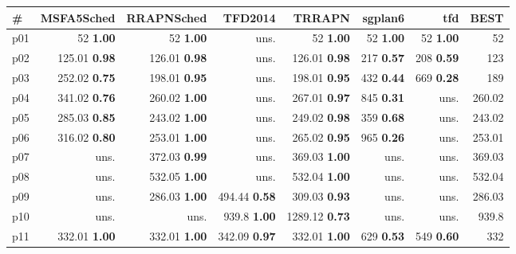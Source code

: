 \begin{tabular}{|l|rrrrrr|r|}
\hline
\textbf{\#} & \textbf{MSFA5Sched} & \textbf{RRAPNSched} & \textbf{TFD2014} & \textbf{TRRAPN} & \textbf{sgplan6} & \textbf{tfd} & \textbf{BEST}\\
\hline
p01 & {\footnotesize 52} \textbf{1.00} & {\footnotesize 52} \textbf{1.00} & uns. & {\footnotesize 52} \textbf{1.00} & {\footnotesize 52} \textbf{1.00} & {\footnotesize 52} \textbf{1.00} & 52\\
p02 & {\footnotesize 125.01} \textbf{0.98} & {\footnotesize 126.01} \textbf{0.98} & uns. & {\footnotesize 126.01} \textbf{0.98} & {\footnotesize 217} \textbf{0.57} & {\footnotesize 208} \textbf{0.59} & 123\\
p03 & {\footnotesize 252.02} \textbf{0.75} & {\footnotesize 198.01} \textbf{0.95} & uns. & {\footnotesize 198.01} \textbf{0.95} & {\footnotesize 432} \textbf{0.44} & {\footnotesize 669} \textbf{0.28} & 189\\
p04 & {\footnotesize 341.02} \textbf{0.76} & {\footnotesize 260.02} \textbf{1.00} & uns. & {\footnotesize 267.01} \textbf{0.97} & {\footnotesize 845} \textbf{0.31} & uns. & 260.02\\
p05 & {\footnotesize 285.03} \textbf{0.85} & {\footnotesize 243.02} \textbf{1.00} & uns. & {\footnotesize 249.02} \textbf{0.98} & {\footnotesize 359} \textbf{0.68} & uns. & 243.02\\
p06 & {\footnotesize 316.02} \textbf{0.80} & {\footnotesize 253.01} \textbf{1.00} & uns. & {\footnotesize 265.02} \textbf{0.95} & {\footnotesize 965} \textbf{0.26} & uns. & 253.01\\
p07 & uns. & {\footnotesize 372.03} \textbf{0.99} & uns. & {\footnotesize 369.03} \textbf{1.00} & uns. & uns. & 369.03\\
p08 & uns. & {\footnotesize 532.05} \textbf{1.00} & uns. & {\footnotesize 532.04} \textbf{1.00} & uns. & uns. & 532.04\\
p09 & uns. & {\footnotesize 286.03} \textbf{1.00} & {\footnotesize 494.44} \textbf{0.58} & {\footnotesize 309.03} \textbf{0.93} & uns. & uns. & 286.03\\
p10 & uns. & uns. & {\footnotesize 939.8} \textbf{1.00} & {\footnotesize 1289.12} \textbf{0.73} & uns. & uns. & 939.8\\
p11 & {\footnotesize 332.01} \textbf{1.00} & {\footnotesize 332.01} \textbf{1.00} & {\footnotesize 342.09} \textbf{0.97} & {\footnotesize 332.01} \textbf{1.00} & {\footnotesize 629} \textbf{0.53} & {\footnotesize 549} \textbf{0.60} & 332\\

\end{tabular}
